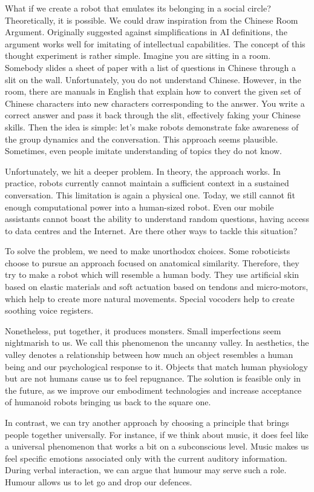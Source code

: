 What if we create a robot that emulates its belonging in a social circle? Theoretically, it is possible. We could draw inspiration from the Chinese Room Argument. Originally suggested against simplifications in AI definitions, the argument works well for imitating of intellectual capabilities. The concept of this thought experiment is rather simple. Imagine you are sitting in a room. Somebody slides a sheet of paper with a list of questions in Chinese through a slit on the wall. Unfortunately, you do not understand Chinese. However, in the room, there are manuals in English that explain how to convert the given set of Chinese characters into new characters corresponding to the answer. You write a correct answer and pass it back through the slit, effectively faking your Chinese skills. Then the idea is simple: let’s make robots demonstrate fake awareness of the group dynamics and the conversation. This approach seems plausible. Sometimes, even people imitate understanding of topics they do not know. 

Unfortunately, we hit a deeper problem. In theory, the approach works. In practice, robots currently cannot maintain a sufficient context in a sustained conversation. This limitation is again a physical one. Today, we still cannot fit enough computational power into a human-sized robot. Even our mobile assistants cannot boast the ability to understand random questions, having access to data centres and the Internet. Are there other ways to tackle this situation?

To solve the problem, we need to make unorthodox choices. Some roboticists choose to pursue an approach focused on anatomical similarity. Therefore, they try to make a robot which will resemble a human body. They use artificial skin based on elastic materials and soft actuation based on tendons and micro-motors, which help to create more natural movements. Special vocoders help to create soothing voice registers. 

Nonetheless, put together, it produces monsters. Small imperfections seem nightmarish to us. We call this phenomenon the uncanny valley. In aesthetics, the valley denotes a relationship between how much an object resembles a human being and our psychological response to it. Objects that match human physiology but are not humans cause us to feel repugnance. The solution is feasible only in the future, as we improve our embodiment technologies and increase acceptance of humanoid robots bringing us back to the square one.

In contrast, we can try another approach by choosing a principle that brings people together universally. For instance, if we think about music, it does feel like a universal phenomenon that works a bit on a subconscious level. Music makes us feel specific emotions associated only with the current auditory information. During verbal interaction, we can argue that humour may serve such a role. Humour allows us to let go and drop our defences. 

